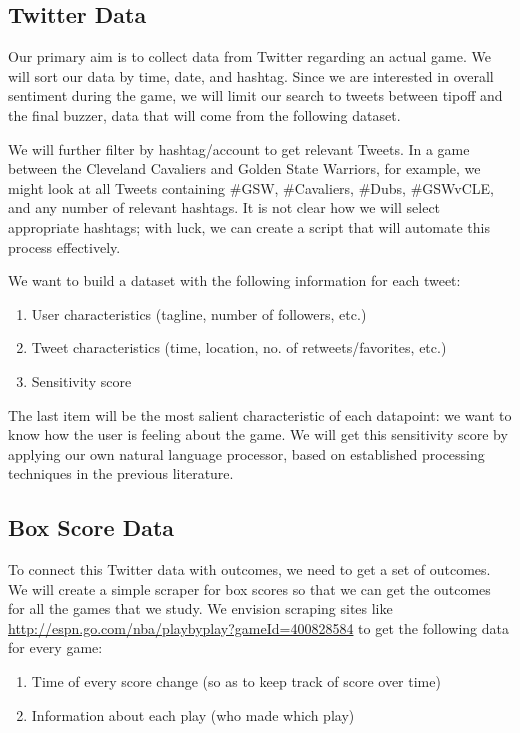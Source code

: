\documentclass[12pt]{article}
\begin{document}
\subsection{Twitter Data}

Our primary aim is to collect data from Twitter regarding an actual game. We will sort our data by time, date, and hashtag. Since we are interested in overall sentiment during the game, we will limit our search to tweets between tipoff and the final buzzer, data that will come from the following dataset. 

We will further filter by hashtag/account to get relevant Tweets. In a game between the Cleveland Cavaliers and Golden State Warriors, for example, we might look at all Tweets containing \#GSW, \#Cavaliers, \#Dubs, \#GSWvCLE, and any number of relevant hashtags. It is not clear how we will select appropriate hashtags; with luck, we can create a script that will automate this process effectively. 

We want to build a dataset with the following information for each tweet:
\begin{enumerate}
	\item User characteristics (tagline, number of followers, etc.)
	\item Tweet characteristics (time, location, no. of retweets/favorites, etc.)
	\item Sensitivity score
\end{enumerate}

\noindent
The last item will be the most salient characteristic of each datapoint: we want to know how the user is feeling about the game. We will get this sensitivity score by applying our own natural language processor, based on established processing techniques in the previous literature. 

\subsection{Box Score Data}

To connect this Twitter data with outcomes, we need to get a set of outcomes. We will create a simple scraper for box scores so that we can get the outcomes for all the games that we study. We envision scraping sites like \url{http://espn.go.com/nba/playbyplay?gameId=400828584} to get the following data for every game:
\begin{enumerate}
	\item Time of every score change (so as to keep track of score over time)
	\item Information about each play (who made which play)
\end{enumerate}
\end{document}
